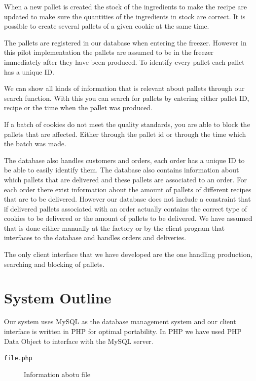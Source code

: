 \documentclass[a4paper]{article}
\begin{document}
When a new pallet is created the stock of the ingredients to make the recipe are updated to make sure the quantities of the ingredients in stock are correct. It is possible to create several pallets of a given cookie at the same time.

The pallets are registered in our database when entering the freezer. However in this pilot implementation the pallets are assumed to be in the freezer immediately after they have been produced. To identify every pallet each pallet has a unique ID.

We can show all kinds of information that is relevant about pallets through our search function. With this you can search for pallets by entering either pallet ID, recipe or the time when the pallet was produced.

If a batch of cookies do not meet the quality standards, you are able to block the pallets that are affected. Either through the pallet id or through the time which the batch was made. 

The database also handles customers and orders, each order has a unique ID to be able to easily identify them. The database also contains information about which pallets that are delivered and these pallets are associated to an order. For each order there exist information about the amount of pallets of different recipes that are to be delivered. However our database does not include a constraint that if delivered pallets associated with an order actually contains the correct type of cookies to be delivered or the amount of pallets to be delivered. We have assumed that is done either manually at the factory or by the client program that interfaces to the database and handles orders and deliveries.

The only client interface that we have developed are the one handling production, searching and blocking of pallets.




\section{System Outline}
Our system uses MySQL as the database management system and our client interface is written in PHP for optimal portability. In PHP we have used PHP Data Object to interface with the MySQL server. 


\begin{description}
\item[\texttt{file.php}]{Information abotu file}
\end{description}
\end{document}
